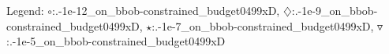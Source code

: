 Legend: {\color{NavyBlue}$\circ$}:.\cob-1e-12\_on\_bbob-constrained\_budget0499xD, {\color{Magenta}$\diamondsuit$}:.\cob-1e-9\_on\_bbob-constrained\_budget0499xD, {\color{Orange}$\star$}:.\cob-1e-7\_on\_bbob-constrained\_budget0499xD, {\color{CornflowerBlue}$\triangledown$}:.\cob-1e-5\_on\_bbob-constrained\_budget0499xD